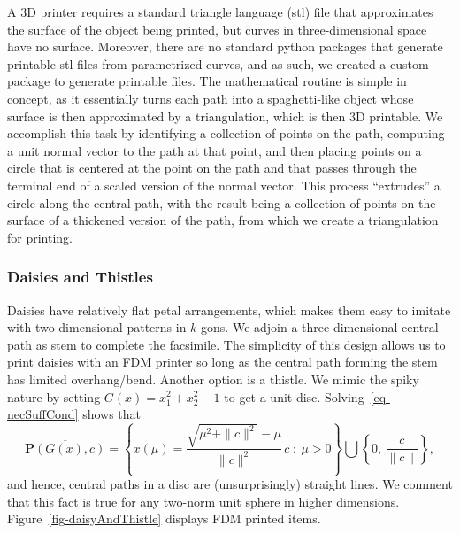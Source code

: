 \documentclass{article}
\def\bP{\mathbf{P}}
\begin{document}
A 3D printer requires a standard triangle language (stl) file that approximates the
surface of the object being printed, but curves in three-dimensional space
have no surface. Moreover, there are no standard python packages that generate printable stl 
files from parametrized curves, and as such, we created a custom package to generate printable 
files. The mathematical routine is simple in concept, as it essentially turns each path into 
a spaghetti-like object whose surface is then approximated by a triangulation, which is then 3D 
printable. We accomplish this task by identifying a collection of points on the path, computing 
a unit normal vector to the path at that point, and then placing points on a circle that is centered at 
the point on the path and that passes through the terminal end of a scaled version of the normal 
vector. This process ``extrudes'' a circle along the central path, with the result being a 
collection of points on the surface of a thickened version of the path, from which we create 
a triangulation for printing. 

\subsubsection*{Daisies and Thistles}

Daisies have relatively flat petal arrangements, which makes them easy to imitate
with two-dimensional patterns in $k$-gons. We adjoin a three-dimensional central path as stem to 
complete the facsimile. The simplicity of this design allows us to print daisies 
with an FDM printer so long as the central path forming the stem has limited overhang/bend.
Another option is a thistle. We mimic the spiky nature by setting $G(x) = x_1^2 + x_2^2 - 1$
to get a unit disc. Solving~\eqref{eq-necSuffCond} shows that
\[
\overline{\bP(G(x),c)} = \left\{ x(\mu) =
    \frac{\sqrt{\mu^2 + \| c \|^2} - \mu}{\|c\|^2} \, c \; : \: \mu > 0 \right\}
    \bigcup \left\{ 0, \, \frac{c}{\|c\|} \right\},
\]
and hence, central paths in a disc are (unsurprisingly) straight lines. We comment
that this fact is true for any two-norm unit sphere in higher dimensions. 
Figure~\ref{fig-daisyAndThistle} displays FDM printed items.
\end{document}
